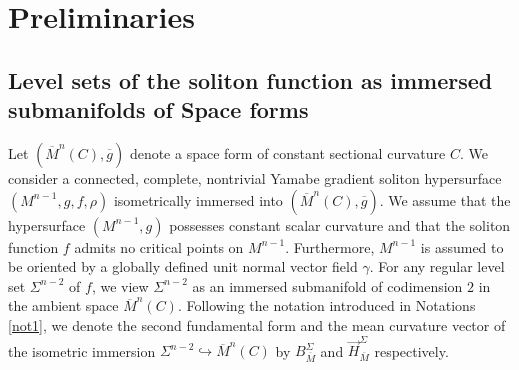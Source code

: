 \documentclass[11pt]{amsart}
\newtheorem{theorem}{Theorem}[section]
\numberwithin{equation}{section}
\begin{document}

\section{\textbf{Preliminaries} }
\subsection{Level sets of the soliton function as immersed submanifolds of Space forms}

Let $\left(\overline{M}^n(C), \overline{g}\right)$ denote a space form of constant sectional curvature $C$. We consider a connected, complete, nontrivial Yamabe gradient soliton hypersurface  $(M^{n-1}, g, f, \rho)$ isometrically immersed into $\left(\overline{M}^n(C), \overline{g}\right)$. We assume that the hypersurface $(M^{n-1}, g)$ possesses constant scalar curvature and that the soliton function $f$ admits no critical points on $M^{n-1}$. Furthermore, $M^{n-1}$ is assumed to be oriented by a globally defined unit normal vector field $\gamma$. For any regular level set $\Sigma^{n-2}$ of $f$, we view $\Sigma^{n-2}$ as an immersed submanifold of codimension $2$ in the ambient space $\overline{M}^n(C)$. Following the notation introduced in Notations \ref{not1}, we denote the second fundamental form and the mean curvature vector %
of the isometric immersion $\Sigma^{n-2} \hookrightarrow \overline{M}^n(C)$ by $B^{\Sigma}_{\overline{M}}$ and $\vec{H}^{\Sigma}_{\overline{M}}$
respectively.
\end{document}

